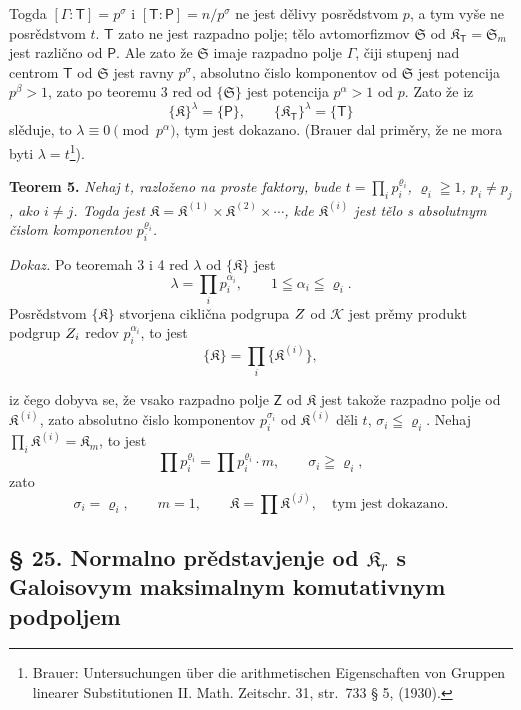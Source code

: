 \documentclass[11pt]{article}
\newcommand{\srcfn}[2]{\footnote{#2}}
\newcommand{\foreign}[1]{#1}
\begin{document}
Togda \([\Gamma:\mathsf{T}]=p^\sigma\) i \([\mathsf{T}:\mathsf P]=n/p^\sigma\) ne jest dělivy posrědstvom \(p\), a tym vyše ne posrědstvom \(t\). \(\mathsf{T}\) zato ne jest razpadno polje; tělo avtomorfizmov \(\mathfrak S\) od \(\mathfrak K_{\mathsf{T}}=\mathfrak S_m\) jest različno od \(\mathsf P\). Ale zato že \(\mathfrak S\) imaje razpadno polje \(\Gamma\), čiji stupenj nad centrom \(\mathsf{T}\) od \(\mathfrak S\) jest ravny \(p^\sigma\), absolutno čislo komponentov od \(\mathfrak S\) jest potencija \(p^\beta>1\), zato po teoremu 3 red od \(\{\mathfrak S\}\) jest potencija \(p^\alpha>1\) od \(p\). Zato že iz
\[
\{\mathfrak K\}^{\lambda}=\{\mathsf P\},
\qquad
\{\mathfrak K_{\mathsf{T}}\}^{\lambda}=\{\mathsf{T}\}
\]
slěduje, to \(\lambda\equiv0\pmod {p^\alpha}\), tym jest dokazano. (Brauer dal priměry, že ne mora byti \(\lambda=t\)\srcfn{1}{\foreign{Brauer: Untersuchungen über die arithmetischen Eigenschaften von Gruppen linearer Substitutionen II. Math. Zeitschr. 31, str.~733 § 5, (1930).}}).

\textbf{Teorem 5.} \emph{Nehaj \(t\), razloženo na proste faktory, bude \(t=\prod_i p_i^{\varrho_i}\), \(\varrho_i\geqq1\), \(p_i\ne p_j\), ako \(i\ne j\). Togda jest \(\mathfrak K=\mathfrak K^{(1)}\times\mathfrak K^{(2)}\times\cdots\), kde \(\mathfrak K^{(i)}\) jest tělo s absolutnym čislom komponentov \(p_i^{\varrho_i}\).}

\emph{Dokaz.} Po teoremah 3 i 4 red \(\lambda\) od \(\{\mathfrak K\}\) jest
\[
\lambda=\prod_i p_i^{\alpha_i},\qquad 1\leqq\alpha_i\leqq\varrho_i.
\]
Posrědstvom \(\{\mathfrak K\}\) stvorjena ciklična podgrupa \(\mathscr \mathsf{Z}\) od \(\mathscr K\) jest prěmy produkt podgrup \(\mathscr \mathsf{Z}_i\) redov \(p_i^{\alpha_i}\), to jest
\[
\{\mathfrak K\}=\prod_i\{\mathfrak K^{(i)}\},
\]

iz čego dobyva se, že vsako razpadno polje \(\mathsf{Z}\) od \(\mathfrak K\) jest takože razpadno polje od \(\mathfrak K^{(i)}\), zato absolutno čislo komponentov \(p_i^{\sigma_i}\) od \(\mathfrak K^{(i)}\) děli \(t\), \(\sigma_i\leqq\varrho_i\). Nehaj \(\prod_i \mathfrak K^{(i)}=\mathfrak K_m\), to jest
\[
\prod p_i^{\varrho_i}=\prod p_i^{\varrho_i}\cdot m,
\qquad
\sigma_i\geqq\varrho_i,
\]
zato
\[
\sigma_i=\varrho_i,\qquad m=1,\qquad
\mathfrak K=\prod \mathfrak K^{(j)},
\quad\text{tym jest dokazano.}
\]

\subsection*{§ 25. Normalno prědstavjenje od \(\mathfrak K_r\) s Galoisovym maksimalnym komutativnym podpoljem\protect\footnotemark}
\label{normaldarstellung-von-r_r-mit-galoisschem-maximalem-kommutativem-teilkoerper-1}
\end{document}
